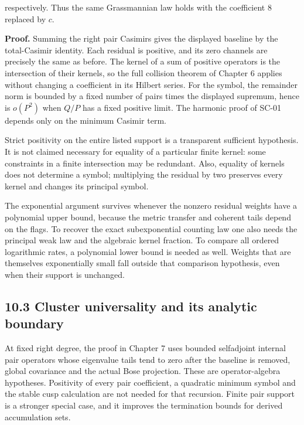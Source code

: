 \documentclass[a4paper,11pt]{article}
\numberwithin{equation}{section}
\begin{document}
respectively. Thus the same Grassmannian law holds with the coefficient \(8\) replaced by \(c\).

\textbf{Proof.} Summing the right pair Casimirs gives the displayed baseline by the total-Casimir identity. Each residual is positive, and its zero channels are precisely the same as before. The kernel of a sum of positive operators is the intersection of their kernels, so the full collision theorem of Chapter 6 applies without changing a coefficient in its Hilbert series. For the symbol, the remainder norm is bounded by a fixed number of pairs times the displayed supremum, hence is \(o(P^2)\) when \(Q/P\) has a fixed positive limit. The harmonic proof of SC-01 depends only on the minimum Casimir term.

Strict positivity on the entire listed support is a transparent sufficient hypothesis. It is not claimed necessary for equality of a particular finite kernel: some constraints in a finite intersection may be redundant. Also, equality of kernels does not determine a symbol; multiplying the residual by two preserves every kernel and changes its principal symbol.

The exponential argument survives whenever the nonzero residual weights have a polynomial upper bound, because the metric transfer and coherent tails depend on the flags. To recover the exact subexponential counting law one also needs the principal weak law and the algebraic kernel fraction. To compare all ordered logarithmic rates, a polynomial lower bound is needed as well. Weights that are themselves exponentially small fall outside that comparison hypothesis, even when their support is unchanged.

\hypertarget{cluster-universality-and-its-analytic-boundary}{%
\subsection{10.3 Cluster universality and its analytic boundary}\label{cluster-universality-and-its-analytic-boundary}}

At fixed right degree, the proof in Chapter 7 uses bounded selfadjoint internal pair operators whose eigenvalue tails tend to zero after the baseline is removed, global covariance and the actual Bose projection. These are operator-algebra hypotheses. Positivity of every pair coefficient, a quadratic minimum symbol and the stable cusp calculation are not needed for that recursion. Finite pair support is a stronger special case, and it improves the termination bounds for derived accumulation sets.
\end{document}
